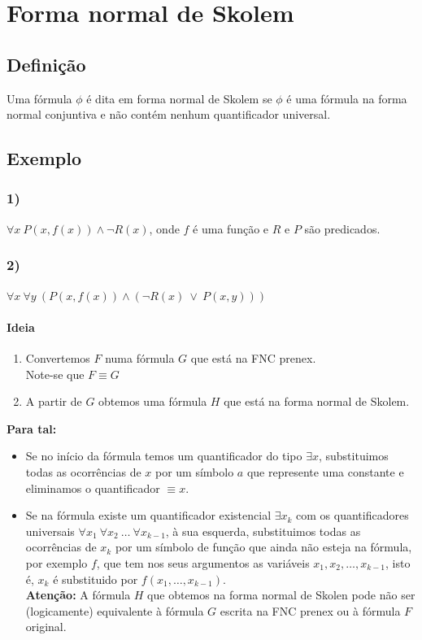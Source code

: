 \documentclass[11pt]{report}
\begin{document}
    \chapter*{Forma normal de Skolem} {
        \section*{Definição} {
            Uma fórmula $\phi$ é dita em forma normal de Skolem se $\phi$ é uma fórmula na forma normal conjuntiva e não contém nenhum quantificador universal.
        }
        \section*{Exemplo} {
            \subsection*{1)} {
                $\forall x~P(x, f(x))\wedge\neg R(x) $, onde $f$ é uma função e $R$ e $P$ são predicados.\\
            }
            \subsection*{2)} {
                $\forall x~\forall y~(P(x, f(x)) \wedge (\neg R(x)~\vee~P(x,y)))$
                \subsubsection*{Ideia} {
                    \begin{enumerate}
                        \item Convertemos $F$ numa fórmula $G$ que está na FNC prenex.\\ Note-se que $F \equiv G$
                        \item A partir de $G$ obtemos uma fórmula $H$ que está na forma normal de Skolem.
                    \end{enumerate}
                    \textbf{Para tal:}\\
                    \begin{itemize}
                        \item Se no início da fórmula temos um quantificador do tipo $\exists x$, substituimos todas as ocorrências de $x$ por um símbolo $a$ que represente uma constante e eliminamos o quantificador $\equiv x$.
                        \item Se na fórmula existe um quantificador existencial $\exists x_k$ com os quantificadores universais $\forall x_1~\forall x_2~\dots~\forall x_{k-1}$, à sua esquerda, substituimos todas as ocorrências de $x_k$ por um símbolo de função que ainda não esteja na fórmula, por exemplo $f$, que tem nos seus argumentos as variáveis $x_1, x_2, \dots, x_{k-1}$, isto é, $x_k$ é substituido por $f(x_1,\ldots,x_{k-1})$.\\\textbf{Atenção:} A fórmula $H$ que obtemos na forma normal de Skolen pode não ser (logicamente) equivalente à fórmula $G$ escrita na FNC prenex ou à fórmula $F$ original.
                    \end{itemize}
                }
            }
        }
    }
\end{document}
